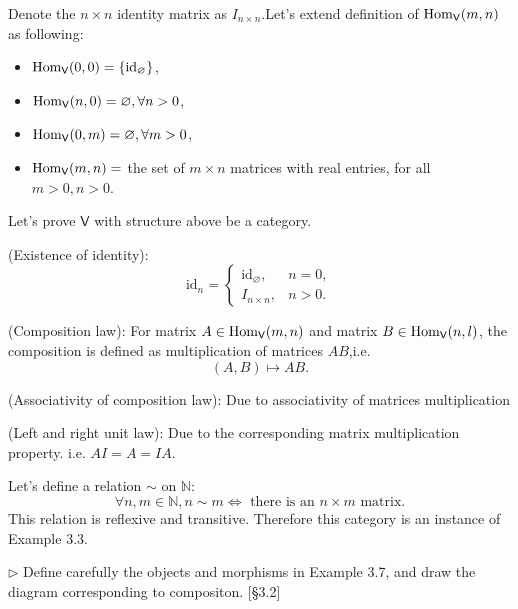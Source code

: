 \begin{solution}
Denote the $n\times n$ identity matrix as $I_{n\times n}$.Let's extend definition of $\mathrm{Hom}_{\mathsf{V}}(m,n)$ as following:
\begin{itemize}
\item $\mathrm{Hom}_{\mathsf{V}}(0,0)=\{\text{id}_{\varnothing}\}$,
\item $\mathrm{Hom}_{\mathsf{V}}(n,0) = \varnothing, \forall n > 0$,
\item $\mathrm{Hom}_{\mathsf{V}}(0,m) = \varnothing, \forall m > 0$,
\item $\mathrm{Hom}_{\mathsf{V}}(m,n) = $ the set of $m\times n$ matrices with real
  entries, for all $m>0, n>0$.
\end{itemize}

Let's prove $\mathsf{V}$ with structure above be a category.

(Existence of identity): $$\text{id}_n=\begin{cases}
\text{id}_{\varnothing}, &n=0,\\
I_{n\times n}, &n > 0.
\end{cases}$$ 

(Composition law): For matrix $A\in \mathrm{Hom}_{\mathsf{V}}(m,n)$ and matrix $B\in \mathrm{Hom}_{\mathsf{V}}(n,l)$, the composition is defined 
as multiplication of matrices $AB$,i.e. $$(A, B) \mapsto  AB.$$

(Associativity of composition law): Due to associativity of matrices multiplication

(Left and right unit law): Due to the corresponding matrix multiplication property. i.e. $AI = A =IA$.

Let's define a relation $\sim$ on $\mathbb{N}$:
$$\forall n,m\in \mathbb{N}, n\sim m\iff \text{ there is an }n\times m \text{ matrix}.$$
This relation is reflexive and transitive. Therefore this category is an instance of Example 3.3.
\end{solution}

\begin{problem}[3.7]
  $\rhd$ Define carefully the objects and morphisms in Example 3.7, and draw the
  diagram corresponding to compositon. [\S 3.2]
\end{problem}

